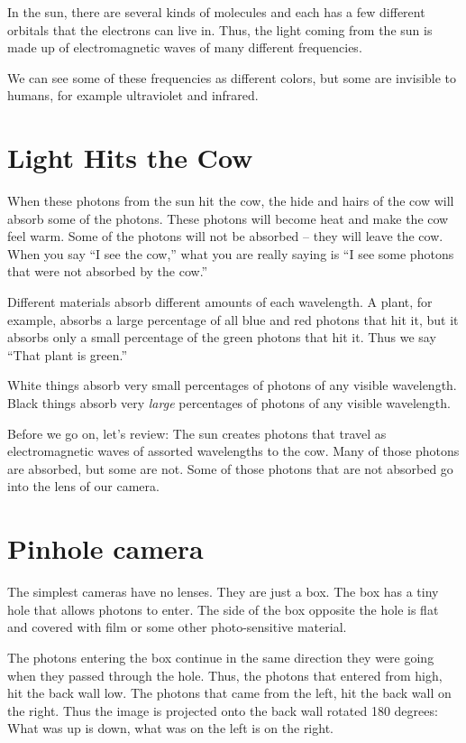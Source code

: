 In the sun, there are several kinds of molecules and each has a few
different orbitals that the electrons can live in.  Thus, the light
coming from the sun is made up of electromagnetic waves of many
different frequencies.

We can see some of these frequencies as different colors, but some are
invisible to humans, for example ultraviolet and infrared.

\section{Light Hits the Cow}

When these photons from the sun hit the cow, the hide and hairs of the
cow will absorb some of the photons. These photons will become heat
and make the cow feel warm.  Some of the photons will not be absorbed
-- they will leave the cow.  When you say ``I see the cow,'' what you are
really saying is ``I see some photons that were not absorbed by the cow.''

Different materials absorb different amounts of each wavelength. A
plant, for example, absorbs a large percentage of all blue and red
photons that hit it, but it absorbs only a small percentage of the
green photons that hit it.  Thus we say ``That plant is green.''

White things absorb very small percentages of photons of any visible
wavelength.  Black things absorb very \emph{large} percentages of
photons of any visible wavelength.

Before we go on, let's review: The sun creates photons that travel as
electromagnetic waves of assorted wavelengths to the cow.  Many of
those photons are absorbed, but some are not.  Some of those photons
that are not absorbed go into the lens of our camera.

\section{Pinhole camera}

The simplest cameras have no lenses. They are just a box.  The box has
a tiny hole that allows photons to enter.  The side of the box
opposite the hole is flat and covered with film or some other
photo-sensitive material.

The photons entering the box continue in the same direction they were
going when they passed through the hole.  Thus, the photons that
entered from high, hit the back wall low.  The photons that came from
the left, hit the back wall on the right. Thus the image is projected
onto the back wall rotated 180 degrees: What was up is down, what was
on the left is on the right.


